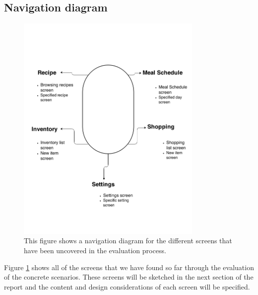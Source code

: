 \subsection{Navigation diagram}


\begin{figure}[H]
	\includegraphics[width=0.8\textwidth]{Grafik/FoodPlanner/NavigationsDiagram}
	\caption{This figure shows a navigation diagram for the different screens that have been uncovered in the evaluation process.}
	\label{NavigationDiagram}
\end{figure}

Figure \cref{NavigationDiagram} shows all of the screens that we have found so far through the evaluation of the concrete scenarios. These screens will be sketched in the next section of the report and the content and design considerations of each screen will be specified.  
